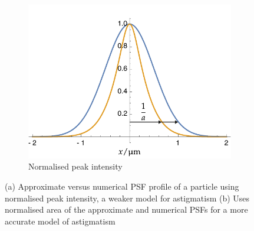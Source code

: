 \begin{figure}
    \centering
    \begin{subfigure}[t]{\linewidth}
        \centering
        \includegraphics{./mathematica/guassian_peak}
        \caption{Normalised peak intensity}
        \label{fig:guassian_peak}
    \end{subfigure}
  \caption{
  (a) Approximate versus numerical \gls{PSF} profile of a particle using normalised peak intensity, a weaker model for astigmatism
  (b) Uses normalised area of the approximate and numerical PSFs for a more accurate model of astigmatism
  }\label{}
\end{figure}

